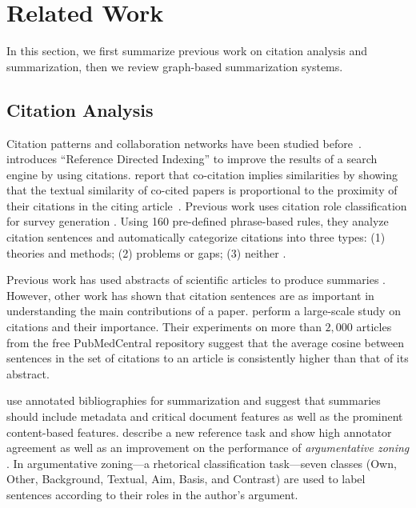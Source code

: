 \section{Related Work}
\label{sec:rel}
In this section, we first summarize previous work on citation analysis and summarization, then
we review graph-based summarization systems. 

\subsection{Citation Analysis}
Citation patterns and collaboration networks have been studied
before~\cite{Newman01a,leskovec2005graphs}.  
introduces ``Reference Directed Indexing'' to improve the results of a
search engine by using citations.
 report that co-citation implies similarities
by showing that the textual similarity of co-cited papers is
proportional to the proximity of their citations in the citing
article~\cite{NanbaKO00}.  Previous work uses citation role
classification for survey generation
\cite{teufel2006,Nanba&Okumura99}.  Using 160 pre-defined phrase-based
rules, they analyze citation sentences and automatically
categorize citations into three types: (1) theories and methods; (2)
problems or gaps; (3) neither \cite{NanbaKO00,NanbaEtal04}.

Previous work has used abstracts of scientific articles to produce
summaries \cite{Kupiec95}.  However, other work has shown that 
citation sentences are as important in understanding the main
contributions of a paper.   perform a
large-scale study on citations and their importance. Their experiments
on more than $2,000$ articles from the free PubMedCentral repository
suggest that the average cosine between sentences in the set of
citations to an article is consistently higher than that of its
abstract.  

 use annotated bibliographies for summarization and
suggest that summaries should include metadata and critical document
features as well as the prominent content-based
features.  describe a new reference task and show
high annotator agreement as well as an improvement on the performance
of \emph{argumentative zoning} \cite{teufel2005}.  In argumentative
zoning---a rhetorical classification task---seven classes (Own, Other,
Background, Textual, Aim, Basis, and Contrast) are used to label
sentences according to their roles in the author's argument.

